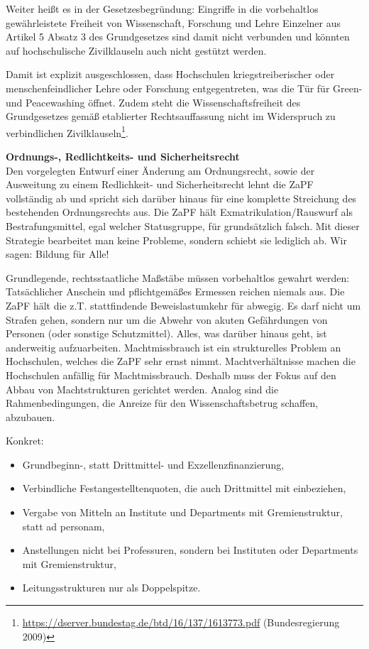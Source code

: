 \documentclass[DIV=calc]{scrartcl}
\let\oldgrqq=\grqq
\def\grqq{\oldgrqq\xspace}
\begin{document}
Weiter heißt es in der Gesetzesbegründung:
\glqq Eingriffe in die vorbehaltlos gewährleistete Freiheit von Wissenschaft, Forschung und Lehre Einzelner aus Artikel 5 Absatz 3 des Grundgesetzes sind damit nicht verbunden und könnten auf hochschulische Zivilklauseln auch nicht gestützt werden.\grqq{} 

Damit ist explizit ausgeschlossen, dass Hochschulen kriegstreiberischer oder menschenfeindlicher Lehre oder Forschung entgegentreten, was die Tür für Green- und Peacewashing öffnet. Zudem steht die Wissenschaftsfreiheit des Grundgesetzes gemäß etablierter Rechtsauffassung nicht im Widerspruch zu verbindlichen Zivilklauseln\footnote{\label{note1}\url{https://dserver.bundestag.de/btd/16/137/1613773.pdf} (Bundesregierung 2009)}.

\textbf{Ordnungs-, Redlichtkeits- und Sicherheitsrecht}\\
Den vorgelegten Entwurf einer Änderung am Ordnungsrecht, sowie der Ausweitung zu einem Redlichkeit- und Sicherheitsrecht lehnt die ZaPF vollständig ab und spricht sich darüber hinaus für eine komplette Streichung des bestehenden Ordnungsrechts aus. Die ZaPF hält Exmatrikulation/Rauswurf als Bestrafungsmittel, egal welcher Statusgruppe, für grundsätzlich falsch. Mit dieser Strategie bearbeitet man keine Probleme, sondern schiebt sie lediglich ab. Wir sagen: Bildung für Alle! 

Grundlegende, rechtsstaatliche Maßstäbe müssen vorbehaltlos gewahrt werden: \glqq Tatsächlicher Anschein\grqq{} und \glqq pflichtgemäßes Ermessen\grqq{} reichen niemals aus. Die ZaPF hält die z.T. stattfindende Beweislastumkehr für abwegig. Es darf nicht um Strafen gehen, sondern nur um die Abwehr von akuten Gefährdungen von Personen (oder sonstige Schutzmittel). Alles, was darüber hinaus geht, ist anderweitig aufzuarbeiten.
Machtmissbrauch ist ein strukturelles Problem an Hochschulen, welches die ZaPF sehr ernst nimmt. Machtverhältnisse machen die Hochschulen anfällig für Machtmissbrauch.
Deshalb muss der Fokus auf den Abbau von Machtstrukturen gerichtet werden. Analog sind die Rahmenbedingungen, die Anreize für den Wissenschaftsbetrug schaffen, abzubauen.

Konkret:
\begin{itemize}
\item Grundbeginn-, statt Drittmittel- und Exzellenzfinanzierung,
\item Verbindliche Festangestelltenquoten, die auch Drittmittel mit einbeziehen,
\item Vergabe von Mitteln an Institute und Departments mit Gremienstruktur, statt ad personam,
\item Anstellungen nicht bei Professuren, sondern bei Instituten oder Departments mit Gremienstruktur,
\item Leitungsstrukturen nur als Doppelspitze.\\
\end{itemize}
\end{document}
